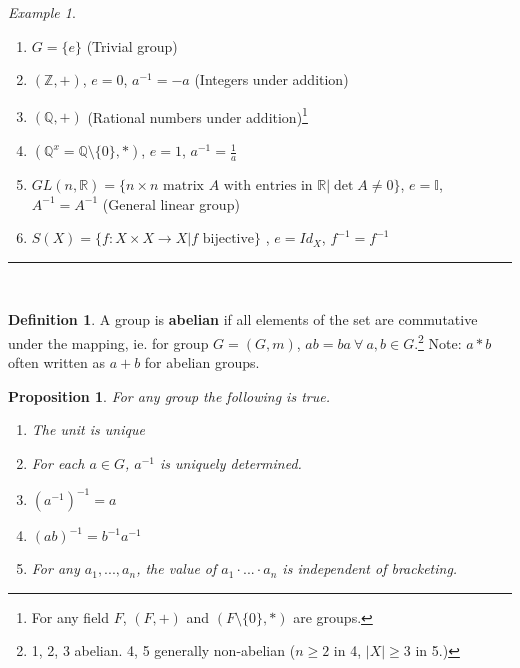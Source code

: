 \documentclass{article}
\newtheorem{theorem}{Proposition}[section]
\theoremstyle{definition}
\newtheorem{definition}{Definition}[section]
\theoremstyle{remark}
\newtheorem*{example}{Example}
\begin{document}
\begin{example}
	~\\
	\begin{enumerate}

		\item \vspace{-2mm}$G=\lbrace e\rbrace$ (Trivial group)
		\item $(\mathbb{Z}, +)$, $e=0$, $a^{-1}=-a$ (Integers under addition)
		\item $(\mathbb{Q}, +)$ (Rational numbers under addition)\footnote{For any field $F$, $(F,+)$ and $(F\setminus\lbrace 0\rbrace, *)$ are groups.}
		\item $(\mathbb{Q}^x=\mathbb{Q}\setminus \lbrace 0\rbrace, *)$, $e=1$, $a^{-1}=\frac{1}{a}$
		\item $GL(n,\mathbb{R})= \lbrace n\times n \text{ matrix } A \text{ with entries in } \mathbb{R}|\det A \neq 0 \rbrace$, $e = \mathbb{I}$, $A^{-1}=A^{-1}$ (General linear group)
		\item $S(X)=\lbrace f:X\times X \rightarrow X | f \text{ bijective}\rbrace$ , $ e=Id_X$, $f^{-1}=f^{-1}$
	\end{enumerate}
\end{example}
\hrule
\vspace{3mm}~\\
\begin{definition}
	A group is \textbf{abelian} if all elements of the set are commutative under the mapping, ie. for group $G=(G,m)$, $ab=ba~\forall~a,b\in G$.\footnote{1, 2, 3 abelian. 4, 5 generally non-abelian ($n\geq 2$ in 4, $|X| \geq 3$ in 5.)} Note: $a*b$ often written as $a+b$ for abelian groups.\\
\end{definition}
\begin{theorem} For any group the following is true.
	\begin{enumerate}
		\item The unit is unique
		\item For each $a\in G$, $a^{-1}$ is uniquely determined.
		\item $(a^{-1})^{-1}=a$
		\item $(ab)^{-1}=b^{-1}a^{-1}$
		\item For any $a_1, ..., a_n$, the value of $a_1\cdot ... \cdot a_n$ is independent of bracketing.
	\end{enumerate}
\end{theorem}
\end{document}
